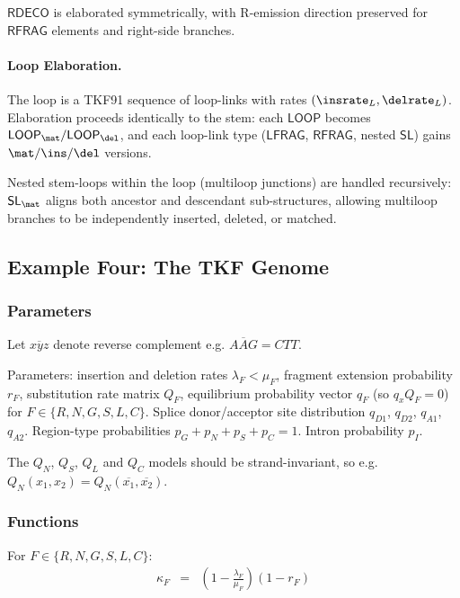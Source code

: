 $\mathsf{RDECO}$ is elaborated symmetrically, with R-emission
direction preserved for $\mathsf{RFRAG}$ elements and right-side
branches.

\paragraph{Loop Elaboration.}

The loop is a TKF91 sequence of loop-links with rates
$(\insrate_L, \delrate_L)$.
Elaboration proceeds identically to the stem: each
$\mathsf{LOOP}$ becomes $\mathsf{LOOP}_\mat / \mathsf{LOOP}_\del$,
and each loop-link type ($\mathsf{LFRAG}$, $\mathsf{RFRAG}$,
nested $\mathsf{SL}$) gains $\mat/\ins/\del$ versions.

Nested stem-loops within the loop (multiloop junctions) are
handled recursively: $\mathsf{SL}_\mat$ aligns both ancestor
and descendant sub-structures, allowing multiloop branches to
be independently inserted, deleted, or matched.


\subsection{Example Four: The TKF Genome}


\subsubsection{Parameters}

Let $\overline{xyz}$ denote reverse complement e.g. $\overline{AAG}=CTT$.

Parameters: insertion and deletion rates $\lambda_F < \mu_F$, fragment extension probability $r_F$,
substitution rate matrix $Q_F$, equilibrium probability vector $q_F$ (so $q_x Q_F = 0$)
for $F \in \{ R, N, G, S, L, C \}$.
Splice donor/acceptor site distribution $q_{D1}$,  $q_{D2}$, $q_{A1}$, $q_{A2}$.
Region-type probabilities $p_G + p_N + p_S + p_C = 1$.
Intron probability $p_I$.

The $Q_N$, $Q_S$, $Q_L$ and $Q_C$ models should be strand-invariant, so e.g. $Q_N(x_1,x_2) = Q_N(\overline{x_1},\overline{x_2})$.

\subsubsection{Functions}

For $F \in \{ R, N, G, S, L, C \}$:
\begin{eqnarray*}
\kappa_F & = & \left( 1 - \frac{\lambda_F}{\mu_F} \right) \left( 1 - r_F \right)
\end{eqnarray*}


